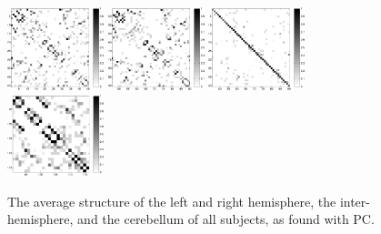 \documentclass[a4paper, 10pt, english, onecolumn]{article}
\begin{document}
\begin{figure}[h!]
  \centering
  \includegraphics[width=0.25\textwidth]{images/struct_hemisphere_1_45}
  \includegraphics[width=0.25\textwidth]{images/struct_hemisphere_46_90}
  \includegraphics[width=0.25\textwidth]{images/struct_inter_hemisphere}
  \includegraphics[width=0.25\textwidth]{images/struct_cerebellum}  
  \caption{The average structure of the left and right hemisphere, the inter-hemisphere, and the cerebellum of all subjects, as found with PC.}
  \label{fig:struct_apart}
\end{figure}
\end{document}

